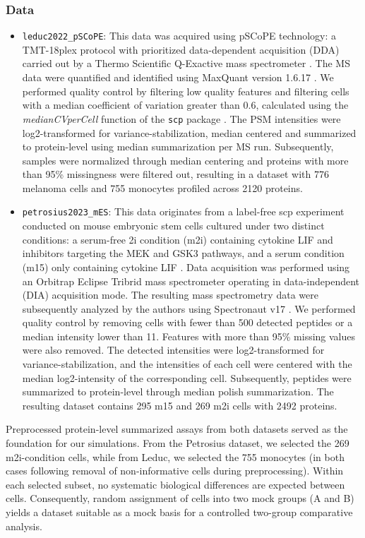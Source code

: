 \subsubsection{Data}
\begin{itemize}
    \item \texttt{leduc2022\_pSCoPE}: This data was acquired using pSCoPE technology: a TMT-18plex protocol with prioritized data-dependent acquisition (DDA) carried out by a Thermo Scientific Q-Exactive mass spectrometer \cite{leduc}. The MS data were quantified and identified using MaxQuant version 1.6.17 \cite{maxquant}. We performed quality control by filtering low quality features and filtering cells with a median coefficient of variation greater than 0.6, calculated using the \textit{medianCVperCell} function of the \texttt{scp} package \cite{scp_paper}. The PSM intensities were log2-transformed for variance-stabilization, median centered and summarized to protein-level using median summarization per MS run. Subsequently, samples were normalized through median centering and proteins with more than 95\% missingness were filtered out, resulting in a dataset with 776 melanoma cells and 755 monocytes profiled across 2120 proteins.
    \item \texttt{petrosius2023\_mES}: This data originates from a label-free scp experiment conducted on mouse embryonic stem cells cultured under two distinct conditions: a serum-free 2i condition (m2i) containing cytokine LIF and inhibitors targeting the MEK and GSK3 pathways, and a serum condition (m15) only containing cytokine LIF \cite{petro}. Data acquisition was performed using an Orbitrap Eclipse Tribrid mass spectrometer operating in data-independent (DIA) acquisition mode. The resulting mass spectrometry data were subsequently analyzed by the authors using Spectronaut v17 \cite{spectronaut}.
    We performed quality control by removing cells with fewer than 500 detected peptides or a median intensity lower than 11. Features with more than 95\% missing values were also removed. The detected intensities were log2-transformed for variance-stabilization, and the intensities of each cell were centered with the median log2-intensity of the corresponding cell. Subsequently, peptides were summarized to protein-level through median polish summarization. The resulting dataset contains 295 m15 and 269 m2i cells with 2492 proteins.
\end{itemize}
Preprocessed protein-level summarized assays from both datasets served as the foundation for our simulations. From the Petrosius dataset, we selected the 269 m2i-condition cells, while from Leduc, we selected the 755 monocytes (in both cases following removal of non-informative cells during preprocessing). Within each selected subset, no systematic biological differences are expected between cells. Consequently, random assignment of cells into two mock groups (A and B) yields a dataset suitable as a mock basis for a controlled two-group comparative analysis.

